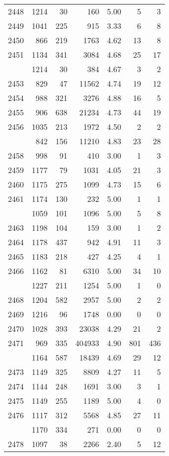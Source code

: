 \documentclass[
]{article}
\begin{document}
\begin{table}
\begin{tabular}[t]{lrrrrrr}
2448 & 1214 & 30 & 160 & 5.00 & 5 & 3\\
2449 & 1041 & 225 & 915 & 3.33 & 6 & 8\\
2450 & 866 & 219 & 1763 & 4.62 & 13 & 8\\
2451 & 1134 & 341 & 3084 & 4.68 & 25 & 17\\
\addlinespace
2452 & 1214 & 30 & 384 & 4.67 & 3 & 2\\
2453 & 829 & 47 & 11562 & 4.74 & 19 & 12\\
2454 & 988 & 321 & 3276 & 4.88 & 16 & 5\\
2455 & 906 & 638 & 21234 & 4.73 & 44 & 19\\
2456 & 1035 & 213 & 1972 & 4.50 & 2 & 2\\
\addlinespace
2457 & 842 & 156 & 11210 & 4.83 & 23 & 28\\
2458 & 998 & 91 & 410 & 3.00 & 1 & 3\\
2459 & 1177 & 79 & 1031 & 4.05 & 21 & 3\\
2460 & 1175 & 275 & 1099 & 4.73 & 15 & 6\\
2461 & 1174 & 130 & 232 & 5.00 & 1 & 1\\
\addlinespace
2462 & 1059 & 101 & 1096 & 5.00 & 5 & 8\\
2463 & 1198 & 104 & 159 & 3.00 & 1 & 2\\
2464 & 1178 & 437 & 942 & 4.91 & 11 & 3\\
2465 & 1183 & 218 & 427 & 4.25 & 4 & 1\\
2466 & 1162 & 81 & 6310 & 5.00 & 34 & 10\\
\addlinespace
2467 & 1227 & 211 & 1254 & 5.00 & 1 & 0\\
2468 & 1204 & 582 & 2957 & 5.00 & 2 & 2\\
2469 & 1216 & 96 & 1748 & 0.00 & 0 & 0\\
2470 & 1028 & 393 & 23038 & 4.29 & 21 & 2\\
2471 & 969 & 335 & 404933 & 4.90 & 801 & 436\\
\addlinespace
2472 & 1164 & 587 & 18439 & 4.69 & 29 & 12\\
2473 & 1149 & 325 & 8809 & 4.27 & 11 & 5\\
2474 & 1144 & 248 & 1691 & 3.00 & 3 & 1\\
2475 & 1149 & 255 & 1189 & 5.00 & 4 & 0\\
2476 & 1117 & 312 & 5568 & 4.85 & 27 & 11\\
\addlinespace
2477 & 1170 & 334 & 271 & 0.00 & 0 & 0\\
2478 & 1097 & 38 & 2266 & 2.40 & 5 & 12\\

\end{tabular}
\end{table}
\end{document}
